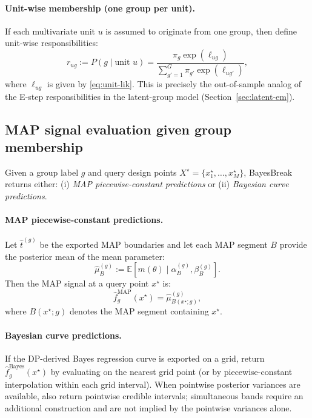 \paragraph{Unit-wise membership (one group per unit).}
If each multivariate unit $u$ is assumed to originate from one group, then define unit-wise
responsibilities:
\begin{equation}
r_{u g}
:= P(g\mid \text{unit }u)
= \frac{\pi_g\exp(\ell_{u g})}{\sum_{g'=1}^G \pi_{g'}\exp(\ell_{u g'})},
\label{eq:unit-resp}
\end{equation}
where $\ell_{u g}$ is given by \eqref{eq:unit-lik}. This is precisely the out-of-sample analog
of the E-step responsibilities in the latent-group model (Section~\ref{sec:latent-em}).

\subsection{MAP signal evaluation given group membership}
\label{sec:map-eval}

Given a group label $g$ and query design points $X^\star=\{x^\star_1,\dots,x^\star_M\}$,
BayesBreak returns either:
(i) \emph{MAP piecewise-constant predictions} or (ii) \emph{Bayesian curve predictions}.

\paragraph{MAP piecewise-constant predictions.}
Let $\widehat{t}^{(g)}$ be the exported MAP boundaries and let each MAP segment $B$ provide
the posterior mean of the mean parameter:
\[
\widehat{\mu}^{(g)}_B := \mathbb{E}[m(\theta)\mid \alpha^{(g)}_B,\beta^{(g)}_B].
\]
Then the MAP signal at a query point $x^\star$ is:
\[
\widehat{f}^{\text{MAP}}_g(x^\star) = \widehat{\mu}^{(g)}_{B(x^\star;g)},
\]
where $B(x^\star;g)$ denotes the MAP segment containing $x^\star$.

\paragraph{Bayesian curve predictions.}
If the DP-derived Bayes regression curve is exported on a grid, return
$\widehat{f}^{\text{Bayes}}_g(x^\star)$ by evaluating on the nearest grid point (or by
piecewise-constant interpolation within each grid interval). When pointwise posterior
variances are available, also return pointwise credible intervals; simultaneous bands require an
additional construction and are not implied by the pointwise variances alone.

